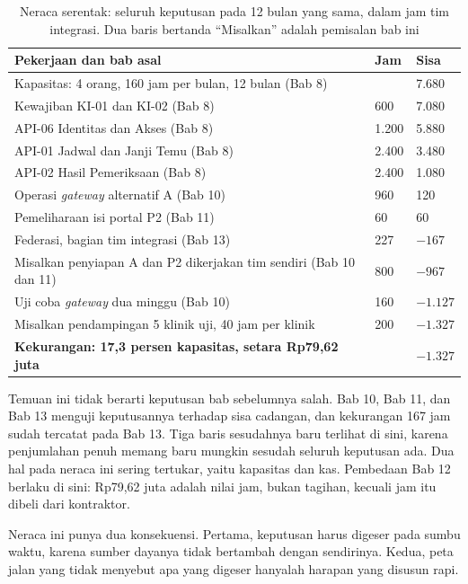 \begin{table}[!htb]
  \centering
  \caption{Neraca serentak: seluruh keputusan pada 12 bulan yang sama, dalam jam tim integrasi. Dua baris bertanda ``Misalkan'' adalah pemisalan bab ini}
  \label{tab:ch14-neraca}
  \footnotesize
  \begin{tabularx}{\textwidth}{GH{1.2cm}H{1.3cm}}
    \hline
    \textbf{Pekerjaan dan bab asal} & \textbf{Jam} & \textbf{Sisa} \\ \hline
    Kapasitas: 4 orang, 160 jam per bulan, 12 bulan (Bab 8) & & 7.680 \\ \hline
    Kewajiban KI-01 dan KI-02 (Bab 8) & 600 & 7.080 \\ \hline
    API-06 Identitas dan Akses (Bab 8) & 1.200 & 5.880 \\ \hline
    API-01 Jadwal dan Janji Temu (Bab 8) & 2.400 & 3.480 \\ \hline
    API-02 Hasil Pemeriksaan (Bab 8) & 2.400 & 1.080 \\ \hline
    Operasi \textit{gateway} alternatif A (Bab 10) & 960 & 120 \\ \hline
    Pemeliharaan isi portal P2 (Bab 11) & 60 & 60 \\ \hline
    Federasi, bagian tim integrasi (Bab 13) & 227 & $-167$ \\ \hline
    Misalkan penyiapan A dan P2 dikerjakan tim sendiri (Bab 10 dan 11) & 800 & $-967$ \\ \hline
    Uji coba \textit{gateway} dua minggu (Bab 10) & 160 & $-1.127$ \\ \hline
    Misalkan pendampingan 5 klinik uji, 40 jam per klinik & 200 & $-1.327$ \\ \hline
    \textbf{Kekurangan: 17,3 persen kapasitas, setara Rp79,62 juta} & & $\mathbf{-1.327}$ \\ \hline
  \end{tabularx}
\end{table}

Temuan ini tidak berarti keputusan bab sebelumnya salah. Bab 10, Bab 11, dan Bab 13 menguji keputusannya terhadap sisa cadangan, dan kekurangan 167 jam sudah tercatat pada Bab 13. Tiga baris sesudahnya baru terlihat di sini, karena penjumlahan penuh memang baru mungkin sesudah seluruh keputusan ada. Dua hal pada neraca ini sering tertukar, yaitu kapasitas dan kas. Pembedaan Bab 12 berlaku di sini: Rp79,62 juta adalah nilai jam, bukan tagihan,
kecuali jam itu dibeli dari kontraktor.

Neraca ini punya dua konsekuensi. Pertama, keputusan harus digeser pada sumbu waktu, karena sumber dayanya tidak bertambah dengan sendirinya. Kedua, peta jalan yang tidak menyebut apa yang digeser hanyalah harapan yang disusun rapi.

